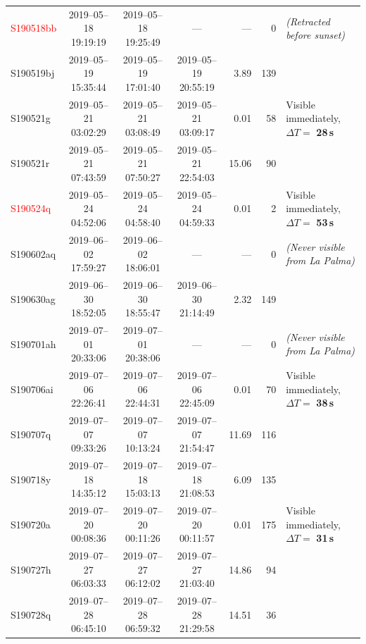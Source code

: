 \begin{colsection}
\begin{colsection}
\begin{table}
\begin{footnotesize}
\begin{center}
\begin{tabular}{l|cccrrl}
            \textcolor{Red}{S190518bb} & 2019--05--18 19:19:19 & 2019--05--18 19:25:49 & ---                   &   --- &   0 & \textit{(Retracted before sunset)}\\
                            S190519bj  & 2019--05--19 15:35:44 & 2019--05--19 17:01:40 & 2019--05--19 20:55:19 &  3.89 & 139 & \\
                            S190521g   & 2019--05--21 03:02:29 & 2019--05--21 03:08:49 & 2019--05--21 03:09:17 &  0.01 &  58 & Visible immediately, $\Delta T=$ \textbf{28\,s}\\
                            S190521r   & 2019--05--21 07:43:59 & 2019--05--21 07:50:27 & 2019--05--21 22:54:03 & 15.06 &  90 & \\
            \textcolor{Red}{S190524q}  & 2019--05--24 04:52:06 & 2019--05--24 04:58:40 & 2019--05--24 04:59:33 &  0.01 &   2 & Visible immediately, $\Delta T=$ \textbf{53\,s}\\
                            S190602aq  & 2019--06--02 17:59:27 & 2019--06--02 18:06:01 & ---                   &   --- &   0 & \textit{(Never visible from La Palma)}\\
                            S190630ag  & 2019--06--30 18:52:05 & 2019--06--30 18:55:47 & 2019--06--30 21:14:49 &  2.32 & 149 & \\
                            S190701ah  & 2019--07--01 20:33:06 & 2019--07--01 20:38:06 & ---                   &   --- &   0 & \textit{(Never visible from La Palma)}\\
                            S190706ai  & 2019--07--06 22:26:41 & 2019--07--06 22:44:31 & 2019--07--06 22:45:09 &  0.01 &  70 & Visible immediately, $\Delta T=$ \textbf{38\,s}\\
                            S190707q   & 2019--07--07 09:33:26 & 2019--07--07 10:13:24 & 2019--07--07 21:54:47 & 11.69 & 116 & \\
                            S190718y   & 2019--07--18 14:35:12 & 2019--07--18 15:03:13 & 2019--07--18 21:08:53 &  6.09 & 135 & \\
                            S190720a   & 2019--07--20 00:08:36 & 2019--07--20 00:11:26 & 2019--07--20 00:11:57 &  0.01 & 175 & Visible immediately, $\Delta T=$ \textbf{31\,s}\\
                            S190727h   & 2019--07--27 06:03:33 & 2019--07--27 06:12:02 & 2019--07--27 21:03:40 & 14.86 &  94 & \\
                            S190728q   & 2019--07--28 06:45:10 & 2019--07--28 06:59:32 & 2019--07--28 21:29:58 & 14.51 &  36 & \\

\end{tabular}
\end{center}
\end{footnotesize}
\end{table}
\end{colsection}
\end{colsection}
